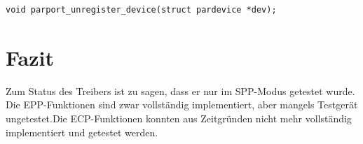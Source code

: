 \documentclass[a4paper,11pt]{article}
\begin{document}
\begin{verbatim}
void parport_unregister_device(struct pardevice *dev);
\end{verbatim}

\section{Fazit}

Zum Status des Treibers ist zu sagen, dass er nur im SPP-Modus getestet wurde. Die EPP-Funktionen sind zwar vollständig implementiert, aber mangels Testgerät ungetestet.Die ECP-Funktionen konnten aus Zeitgründen nicht mehr vollständig implementiert und getestet werden.


\end{document}

